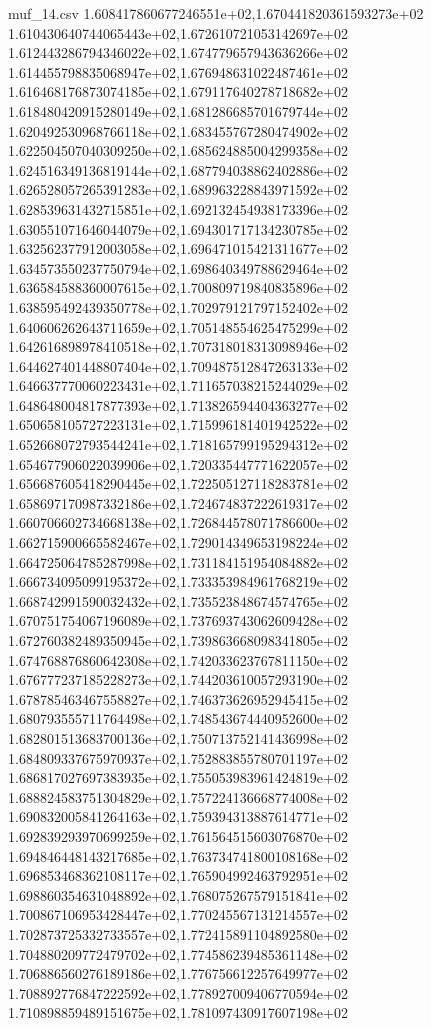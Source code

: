 \begin{filecontents*}{muf_14.csv}
1.608417860677246551e+02,1.670441820361593273e+02
1.610430640744065443e+02,1.672610721053142697e+02
1.612443286794346022e+02,1.674779657943636266e+02
1.614455798835068947e+02,1.676948631022487461e+02
1.616468176873074185e+02,1.679117640278718682e+02
1.618480420915280149e+02,1.681286685701679744e+02
1.620492530968766118e+02,1.683455767280474902e+02
1.622504507040309250e+02,1.685624885004299358e+02
1.624516349136819144e+02,1.687794038862402886e+02
1.626528057265391283e+02,1.689963228843971592e+02
1.628539631432715851e+02,1.692132454938173396e+02
1.630551071646044079e+02,1.694301717134230785e+02
1.632562377912003058e+02,1.696471015421311677e+02
1.634573550237750794e+02,1.698640349788629464e+02
1.636584588360007615e+02,1.700809719840835896e+02
1.638595492439350778e+02,1.702979121797152402e+02
1.640606262643711659e+02,1.705148554625475299e+02
1.642616898978410518e+02,1.707318018313098946e+02
1.644627401448807404e+02,1.709487512847263133e+02
1.646637770060223431e+02,1.711657038215244029e+02
1.648648004817877393e+02,1.713826594404363277e+02
1.650658105727223131e+02,1.715996181401942522e+02
1.652668072793544241e+02,1.718165799195294312e+02
1.654677906022039906e+02,1.720335447771622057e+02
1.656687605418290445e+02,1.722505127118283781e+02
1.658697170987332186e+02,1.724674837222619317e+02
1.660706602734668138e+02,1.726844578071786600e+02
1.662715900665582467e+02,1.729014349653198224e+02
1.664725064785287998e+02,1.731184151954084882e+02
1.666734095099195372e+02,1.733353984961768219e+02
1.668742991590032432e+02,1.735523848674574765e+02
1.670751754067196089e+02,1.737693743062609428e+02
1.672760382489350945e+02,1.739863668098341805e+02
1.674768876860642308e+02,1.742033623767811150e+02
1.676777237185228273e+02,1.744203610057293190e+02
1.678785463467558827e+02,1.746373626952945415e+02
1.680793555711764498e+02,1.748543674440952600e+02
1.682801513683700136e+02,1.750713752141436998e+02
1.684809337675970937e+02,1.752883855780701197e+02
1.686817027697383935e+02,1.755053983961424819e+02
1.688824583751304829e+02,1.757224136668774008e+02
1.690832005841264163e+02,1.759394313887614771e+02
1.692839293970699259e+02,1.761564515603076870e+02
1.694846448143217685e+02,1.763734741800108168e+02
1.696853468362108117e+02,1.765904992463792951e+02
1.698860354631048892e+02,1.768075267579151841e+02
1.700867106953428447e+02,1.770245567131214557e+02
1.702873725332733557e+02,1.772415891104892580e+02
1.704880209772479702e+02,1.774586239485361148e+02
1.706886560276189186e+02,1.776756612257649977e+02
1.708892776847222592e+02,1.778927009406770594e+02
1.710898859489151675e+02,1.781097430917607198e+02

\end{filecontents*}
